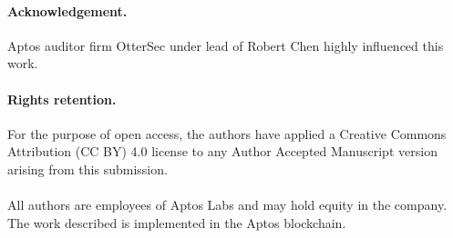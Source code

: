 \documentclass[runningheads]{llncs}
\begin{document}
\begin{credits}
\vspace{0.0ex}
\paragraph{Acknowledgement.} Aptos auditor firm OtterSec under lead of Robert Chen highly influenced this work.
\vspace{-0.5ex}
\paragraph{Rights retention.} For the purpose of open access, the authors have applied a Creative Commons Attribution (CC BY) 4.0 license to any Author Accepted Manuscript version arising from this submission.
\vspace{-0.5ex}
\paragraph{\discintname}
All authors are employees of Aptos Labs and may hold equity in the
company. The work described is implemented in the Aptos blockchain.
\end{credits}



\end{document}
